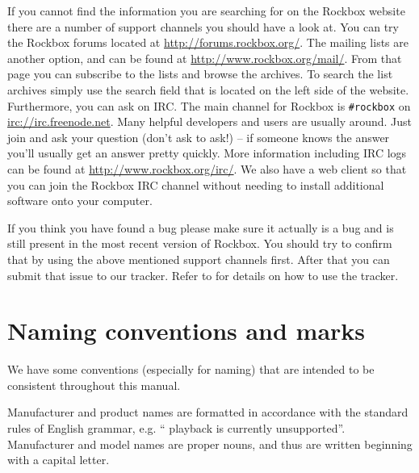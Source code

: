 If you cannot find the information you are searching for on the Rockbox
website there are a number of support channels you should have a look at.
You can try the Rockbox forums located at \url{http://forums.rockbox.org/}.
The mailing lists are another option, and can be found at
\url{http://www.rockbox.org/mail/}. From that page you can subscribe to the
lists and browse the archives. To search the list archives simply use
the search field that is located on the left side of the website.
Furthermore,  you can ask on IRC. The main channel for Rockbox is
\texttt{\#rockbox} on \url{irc://irc.freenode.net}. Many helpful developers
and users are usually around. Just join and ask your question (don't ask to
ask!) -- if someone knows the answer you'll
usually get an answer pretty quickly. More information including IRC logs
can be found at \url{http://www.rockbox.org/irc/}. We also have a web client
so that you can join the Rockbox IRC channel without needing
to install additional software onto your computer.

If you think you have found a bug please make sure it actually is a bug and is
still present in the most recent version of Rockbox. You should try to
confirm that by using the above mentioned support channels first. After that
you can submit that issue to our tracker. Refer to 
for details on how to use the tracker.


\section{Naming conventions and marks}
We have some conventions (especially for naming) that are intended to be
consistent throughout this manual.

Manufacturer and product names are formatted in accordance with the standard
rules of English grammar, e.g. ``\archosplayerman{} playback is currently
unsupported''. Manufacturer and model names are proper nouns, and
thus are written beginning with a capital letter.


